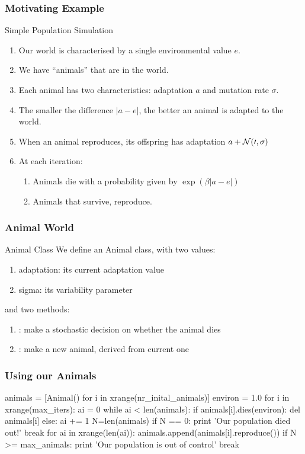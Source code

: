 \begin{frame}[fragile] 
\frametitle{Motivating Example}
\begin{block}{Simple Population Simulation}
\begin{enumerate}
\item Our world is characterised by a single environmental value $e$.
\item We have ``animals'' that are in the world.
\item Each animal has two characteristics: adaptation $a$ and mutation rate $\sigma$.
\item The smaller the difference $|a-e|$, the better an animal is adapted to the world.
\item When an animal reproduces, its offspring has adaptation $a + \cal{N}(0,\sigma)$
\item At each iteration:
\begin{enumerate}
\item Animals die with a probability given by $\exp(\beta|a-e|)$
\item Animals that survive, reproduce.
\end{enumerate}
\end{enumerate}
\end{block}

\end{frame}

\begin{frame}[fragile] 
\frametitle{Animal World}
\begin{block}{Animal Class}
We define an Animal class, with two values:
\begin{enumerate}
\item adaptation: its current adaptation value
\item sigma: its variability parameter
\end{enumerate}
and two methods:
\begin{enumerate}
\item {}: make a stochastic decision on whether the animal dies
\item {}: make a new animal, derived from current one
\end{enumerate}
\end{block}

\end{frame}

\begin{frame}[fragile] 
\frametitle{Using our Animals}
\begin{python}
animals = [Animal() for i in xrange(nr_inital_animals)]
environ = 1.0
for i in xrange(max_iters):
    ai = 0
    while ai < len(animals):
        if animals[i].dies(environ): del animals[i]
        else: ai += 1
    N=len(animals)
    if N == 0:
        print 'Our population died out!'
        break
    for ai in xrange(len(ai)):
        animals.append(animals[i].reproduce())
    if N >= max_animals:
        print 'Our population is out of control'
        break
\end{python}
\end{frame}

